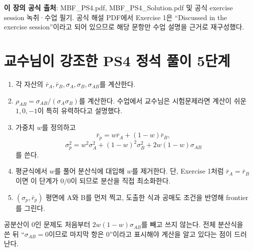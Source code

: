 
\begin{sourcebox}
\textbf{이 장의 공식 출처}: MBF\_PS4.pdf, MBF\_PS4\_Solution.pdf 및 공식 exercise session 녹취·수업 필기. 공식 해설 PDF에서 Exercise 1은 ``Discussed in the exercise session''이라고 되어 있으므로 해당 문항만 수업 설명을 근거로 재구성했다.
\end{sourcebox}

\section*{교수님이 강조한 PS4 정석 풀이 5단계}
\begin{strategybox}[title={\bfseries 시험장에서 그대로 쓰는 5단계}]
\begin{enumerate}
\item 각 자산의 $\bar r_A,\bar r_B,\sigma_A,\sigma_B,\sigma_{AB}$를 계산한다.
\item $\rho_{AB}=\sigma_{AB}/(\sigma_A\sigma_B)$를 계산한다. 수업에서 교수님은 시험문제라면 계산이 쉬운 $1,0,-1$이 특히 유력하다고 설명했다.
\item 가중치 $w$를 정의하고
\[
\bar r_p=w\bar r_A+(1-w)\bar r_B,
\]
\[
\sigma_p^2=w^2\sigma_A^2+(1-w)^2\sigma_B^2+2w(1-w)\sigma_{AB}
\]
를 쓴다.
\item 평균식에서 $w$를 풀어 분산식에 대입해 $w$를 제거한다. 단, Exercise 1처럼 $\bar r_A=\bar r_B$이면 이 단계가 $0/0$이 되므로 분산을 직접 최소화한다.
\item $(\sigma_p,\bar r_p)$ 평면에 A와 B를 먼저 찍고, 도출한 식과 공매도 조건을 반영해 frontier를 그린다.
\end{enumerate}
\end{strategybox}

\begin{warningbox}
공분산이 0인 문제도 처음부터 $2w(1-w)\sigma_{AB}$를 빼고 쓰지 않는다. 전체 분산식을 쓴 뒤 ``$\sigma_{AB}=0$이므로 마지막 항은 0''이라고 표시해야 계산을 알고 있다는 점이 드러난다.
\end{warningbox}

